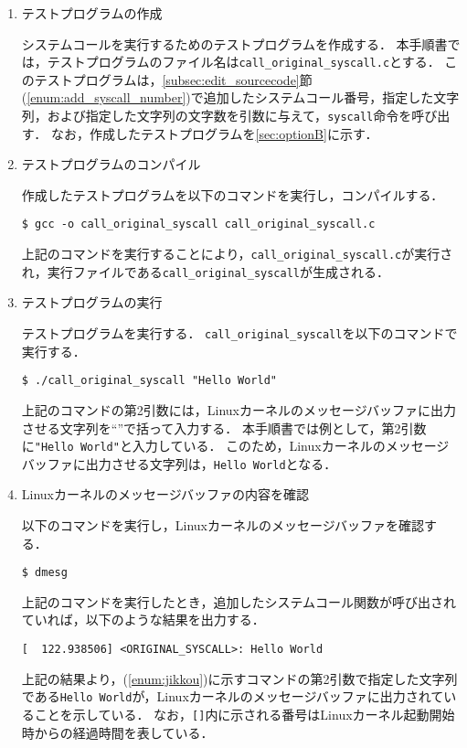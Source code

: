 \documentclass[12pt]{jsarticle}
\begin{document}
\begin{enumerate}
  \item\label{enum:make_test_program} テストプログラムの作成

    システムコールを実行するためのテストプログラムを作成する．
    本手順書では，テストプログラムのファイル名は\verb|call_original_syscall.c|とする．
    このテストプログラムは，\ref{subsec:edit_sourcecode}節(\ref{enum:add_syscall_number})で追加したシステムコール番号，指定した文字列，および指定した文字列の文字数を引数に与えて，\verb|syscall|命令を呼び出す．
    なお，作成したテストプログラムを\ref{sec:optionB}に示す．
    
  \item テストプログラムのコンパイル

    作成したテストプログラムを以下のコマンドを実行し，コンパイルする．

\begin{verbatim}
$ gcc -o call_original_syscall call_original_syscall.c
\end{verbatim}
上記のコマンドを実行することにより，\verb|call_original_syscall.c|が実行され，実行ファイルである\verb|call_original_syscall|が生成される．

\item\label{enum:jikkou} テストプログラムの実行

  テストプログラムを実行する．
  \verb|call_original_syscall|を以下のコマンドで実行する．
\begin{verbatim}
$ ./call_original_syscall "Hello World"
\end{verbatim}
上記のコマンドの第2引数には，Linuxカーネルのメッセージバッファに出力させる文字列を``''で括って入力する．
本手順書では例として，第2引数に\verb|"Hello World"|と入力している．
このため，Linuxカーネルのメッセージバッファに出力させる文字列は，\verb|Hello World|となる．

\item\label{enum:check} Linuxカーネルのメッセージバッファの内容を確認

  以下のコマンドを実行し，Linuxカーネルのメッセージバッファを確認する．
\begin{verbatim}
$ dmesg
\end{verbatim}
上記のコマンドを実行したとき，追加したシステムコール関数が呼び出されていれば，以下のような結果を出力する．
\begin{verbatim}
[  122.938506] <ORIGINAL_SYSCALL>: Hello World
\end{verbatim}
上記の結果より，(\ref{enum:jikkou})に示すコマンドの第2引数で指定した文字列である\verb|Hello World|が，Linuxカーネルのメッセージバッファに出力されていることを示している．
なお，\verb|[]|内に示される番号はLinuxカーネル起動開始時からの経過時間を表している．


\end{enumerate}
\end{document}

